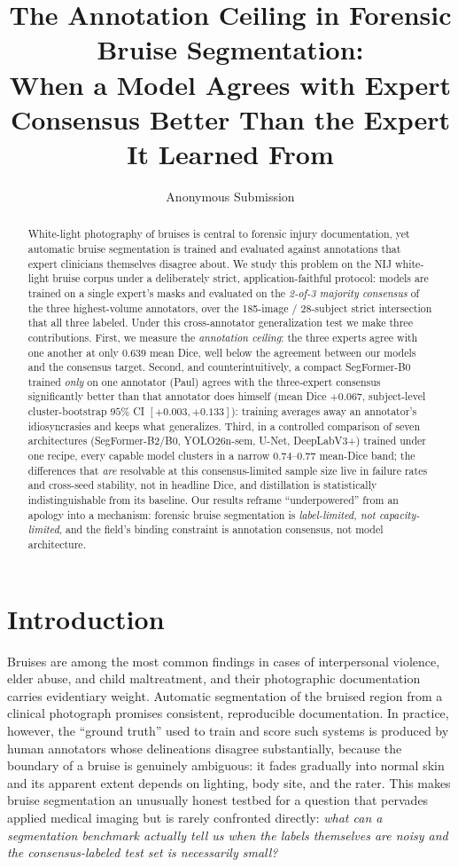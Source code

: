 \documentclass[letterpaper,twocolumn,10pt]{article}
\title{\bf The Annotation Ceiling in Forensic Bruise Segmentation:\\
When a Model Agrees with Expert Consensus Better Than the Expert It Learned From}
\author{Anonymous Submission}
\date{}
\begin{document}
\maketitle

\begin{abstract}
White-light photography of bruises is central to forensic injury documentation,
yet automatic bruise segmentation is trained and evaluated against annotations
that expert clinicians themselves disagree about. We study this problem on the
NIJ white-light bruise corpus under a deliberately strict, application-faithful
protocol: models are trained on a single expert's masks and evaluated on the
\emph{2-of-3 majority consensus} of the three highest-volume annotators, over the
185-image / 28-subject strict intersection that all three labeled. Under this
cross-annotator generalization test we make three contributions. First, we
measure the \emph{annotation ceiling}: the three experts agree with one another at
only $0.639$ mean Dice, well below the agreement between our models and the
consensus target. Second, and counterintuitively, a compact SegFormer-B0 trained
\emph{only} on one annotator (Paul) agrees with the three-expert consensus
significantly better than that annotator does himself (mean Dice
$+0.067$, subject-level cluster-bootstrap $95\%$ CI $[+0.003,+0.133]$): training
averages away an annotator's idiosyncrasies and keeps what generalizes. Third, in
a controlled comparison of seven architectures (SegFormer-B2/B0, YOLO26n-sem,
U-Net, DeepLabV3+) trained under one recipe, every capable model clusters in a
narrow $0.74$--$0.77$ mean-Dice band; the differences that \emph{are} resolvable
at this consensus-limited sample size live in failure rates and cross-seed
stability, not in headline Dice, and distillation is statistically
indistinguishable from its baseline. Our results reframe ``underpowered'' from an
apology into a mechanism: forensic bruise segmentation is \emph{label-limited, not
capacity-limited}, and the field's binding constraint is annotation consensus, not
model architecture.
\end{abstract}

\section{Introduction}
Bruises are among the most common findings in cases of interpersonal violence,
elder abuse, and child maltreatment, and their photographic documentation carries
evidentiary weight. Automatic segmentation of the bruised region from a clinical
photograph promises consistent, reproducible documentation. In practice, however,
the ``ground truth'' used to train and score such systems is produced by human
annotators whose delineations disagree substantially, because the boundary of a
bruise is genuinely ambiguous: it fades gradually into normal skin and its
apparent extent depends on lighting, body site, and the rater. This makes bruise
segmentation an unusually honest testbed for a question that pervades applied
medical imaging but is rarely confronted directly: \emph{what can a segmentation
benchmark actually tell us when the labels themselves are noisy and the
consensus-labeled test set is necessarily small?}
\end{document}
